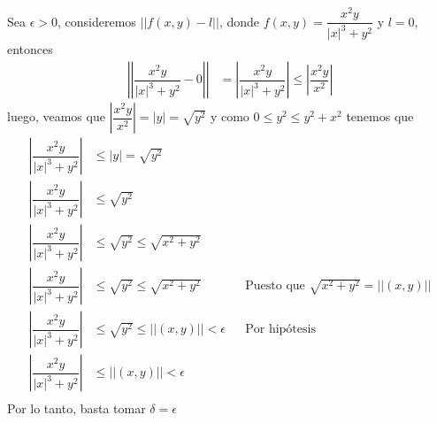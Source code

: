 \documentclass[letterpaper]{article}
\providecommand{\abs}[1]{\left|#1\right|}
\providecommand{\norm}[1]{\left|\left|#1\right|\right|}
\renewcommand{\*}{\cdot}
\theoremstyle{definition}
\begin{document}
Sea $ \epsilon > 0 $, consideremos $ \norm{f(x,y) - l} $, donde $ f(x,y) = \dfrac{x^2y}{\vert x \vert^3 + y^2} $ y $ l = 0 $, entonces
\begin{align*}
	\norm{\dfrac{x^2y}{\vert x \vert^3 + y^2} - 0} &= \abs{\dfrac{x^2y}{\vert x \vert^3 + y^2}} \leq \abs{\dfrac{x^2y}{x^2}}
\end{align*}
luego, veamos que $ \abs{\dfrac{x^2y}{x^2}} = \abs{y} = \sqrt{y^2} $ y como $ 0 \leq y^2 \leq y^2 + x^2 $ tenemos que
\begin{align*}
	\abs{\dfrac{x^2y}{\abs{x}^3 + y^2}} &\leq \abs{y} = \sqrt{y^2}\\
	\abs{\dfrac{x^2y}{\abs{x}^3 + y^2}} &\leq \sqrt{y^2}\\
	\abs{\dfrac{x^2y}{\abs{x}^3 + y^2}} &\leq \sqrt{y^2} \leq \sqrt{x^2 + y^2}\\
	\abs{\dfrac{x^2y}{\abs{x}^3 + y^2}} &\leq \sqrt{y^2} \leq \sqrt{x^2 + y^2} && \text{Puesto que }\sqrt{x^2 + y^2} = \norm{(x,y)} \\
	\abs{\dfrac{x^2y}{\abs{x}^3 + y^2}} &\leq \sqrt{y^2} \leq \norm{(x,y)} < \epsilon && \text{Por hipótesis} \\
	\abs{\dfrac{x^2y}{\abs{x}^3 + y^2}} &\leq \norm{(x,y)} < \epsilon \\
\end{align*}
Por lo tanto, basta tomar $ \delta = \epsilon $
\end{document}
